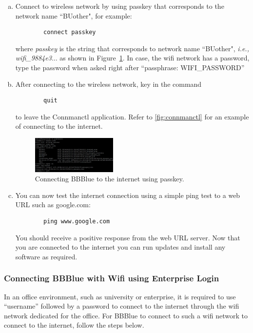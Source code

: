 \begin{enumerate}[a)]
    \item Connect to wireless network by using passkey that corresponds to the network name ``BUother", for example: 
    \begin{verbatim}
        connect passkey
    \end{verbatim}
    where \textit{passkey} is the string  that corresponds to network name
    ``BUother", \textit{i.e.,} \emph{wifi\_9884e3$\ldots$} as shown in
    Figure~\ref{fig:connmanctl}. In case, the wifi network has a password, type
    the password when asked right after ``passphrase: WIFI\_PASSWORD'' 
    \item After connecting to the wireless network, key in the command
    \begin{verbatim}
        quit
    \end{verbatim}
    to leave the Connmanctl application. Refer to \autoref{fig:connmanctl} for an example of connecting to the internet.
    \begin{figure}[H]
        \centering
        \includegraphics[width= 0.4\textwidth]{figs/img/Lab0/connmanctl.JPG}
        \caption{Connecting BBBlue to the  internet using passkey.}
        \label{fig:connmanctl}
    \end{figure}    
    \item You can now test the internet connection using a simple ping test to a web URL such as google.com:
    \begin{verbatim}
        ping www.google.com
    \end{verbatim}
%   
You should receive a positive response from the web URL server. Now that you are connected to the internet you can run updates and install any software as required.
\end{enumerate}


\subsubsection{Connecting BBBlue with Wifi using Enterprise Login}

In an office environment, such as university or enterprise, it is required to
use ``username'' followed by a password to connect to the internet through the
wifi network dedicated for the office. For BBBlue to connect to such a wifi
network to connect to the internet, follow the steps below.

